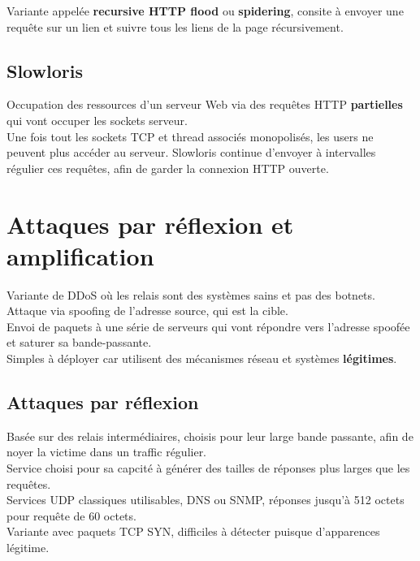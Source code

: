 \documentclass{report}
\begin{document}
				Variante appelée \textbf{recursive HTTP flood} ou \textbf{spidering}, consite à envoyer une requête sur un lien et suivre tous les liens de la page récursivement.\\

			\subsection{Slowloris}

				Occupation des ressources d'un serveur Web via des requêtes HTTP \textbf{partielles} qui vont occuper les sockets serveur.\\

				Une fois tout les sockets TCP et thread associés monopolisés, les users ne peuvent plus accéder au serveur. Slowloris continue d'envoyer à intervalles régulier ces requêtes, afin de garder la connexion HTTP ouverte.\\

	\section{Attaques par réflexion et amplification}

		Variante de DDoS où les relais sont des systèmes sains et pas des botnets.\\
		Attaque via spoofing de l'adresse source, qui est la cible.\\

		Envoi de paquets à une série de serveurs qui vont répondre vers l'adresse spoofée et saturer sa bande-passante.\\

		Simples à déployer car utilisent des mécanismes réseau et systèmes \textbf{légitimes}.\\

		\subsection{Attaques par réflexion}

			Basée sur des relais intermédiaires, choisis pour leur large bande passante, afin de noyer la victime dans un traffic régulier.\\

			Service choisi pour sa capcité à générer des tailles de réponses plus larges que les requêtes.\\
			Services UDP classiques utilisables, DNS ou SNMP, réponses jusqu'à 512 octets pour requête de 60 octets.\\
			Variante avec paquets TCP SYN, difficiles à détecter puisque d'apparences légitime.\\
\end{document}
